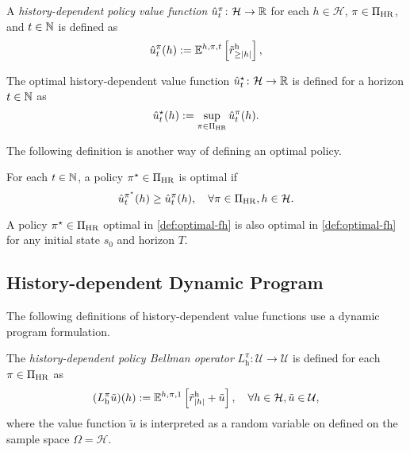 \begin{definition} \label{def:u-pi}
A \emph{history-dependent policy value function} $\hat{u}^{\pi}_t\colon \mathcal{H} \to \mathbb{R}$ for each $h\in \mathcal{H}$, $\pi \in \Pi_{\mathrm{HR}}$, and $t\in \mathbb{N}$ is defined as
  \[
   \hat{u}^{\pi}_t(h) := \mathbb{E}^{h, \pi, t} \left[ \tilde{r}^{\mathrm{h}}_{\ge |h|} \right],
 \]
  \leanok
\end{definition}


\begin{definition}
The optimal history-dependent value function $\hat{u}_t^{\star}\colon \mathcal{H} \to \mathbb{R}$ is defined for a horizon $t\in \mathbb{N}$ as
 \[
  \hat{u}^{\star}_t(h) := \sup_{\pi\in \Pi_{\mathrm{HR}}} \hat{u}_t^{\pi}(h). 
 \] 
\end{definition}

The following definition is another way of defining an optimal policy.
\begin{definition} \label{def:optimal-fh}
For each $t\in \mathbb{N}$, a policy $\pi^{\star} \in \Pi_{\mathrm{HR}}$ is optimal if
\[
   \hat{u}_t^{\pi^{\star}}(h) \ge \hat{u}_t^{\pi}(h), \quad \forall \pi \in \Pi_{\mathrm{HR}}, h\in \mathcal{H}.
 \]
 \leanok
\end{definition}

\begin{theorem} \label{def:optimalvf-imp-optimal}
A policy $\pi^{\star} \in \Pi_{\mathrm{HR}}$ optimal in \cref{def:optimal-fh} is also optimal in \cref{def:optimal-fh} for any initial state $s_0$ and horizon $T$.
\end{theorem}

\subsection{History-dependent Dynamic Program}

The following definitions of history-dependent value functions use a dynamic program formulation.

\begin{definition} \label{def:DPhpi}
The \emph{history-dependent policy Bellman operator} $L_{\mathrm{h}}^{\pi} \colon \mathcal{U} \to \mathcal{U}$ is defined for each $\pi\in \Pi_{\mathrm{HR}}$ as
  \[
    (L_{\mathrm{h}}^{\pi} \tilde{u}) (h)
    :=
    \mathbb{E}^{h, \pi, 1} \left[ \tilde{r}^{\mathrm{h}}_{|h|} + \tilde{u} \right], \quad \forall h\in \mathcal{H}, \tilde{u} \in \mathcal{U},
  \]
  where the value function $\tilde{u}$ is interpreted as a random variable on defined on the sample space $\Omega = \mathcal{H}$.
   \leanok
\end{definition}

